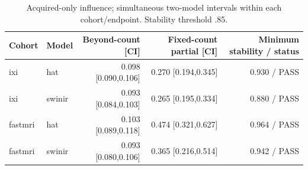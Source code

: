 \begin{table}[t]\centering\small\caption{Acquired-only influence; simultaneous two-model intervals within each cohort/endpoint. Stability threshold .85.}\label{tab:neural}
\begin{tabular}{llrrr}\toprule Cohort & Model & Beyond-count [CI] & Fixed-count partial [CI] & Minimum stability / status\\\midrule
ixi & hat & 0.098 [0.090,0.106] & 0.270 [0.194,0.345] & 0.930 / PASS \\
ixi & swinir & 0.093 [0.084,0.103] & 0.265 [0.195,0.334] & 0.880 / PASS \\
fastmri & hat & 0.103 [0.089,0.118] & 0.474 [0.321,0.627] & 0.964 / PASS \\
fastmri & swinir & 0.093 [0.080,0.106] & 0.365 [0.216,0.514] & 0.942 / PASS \\\bottomrule\end{tabular}\end{table}